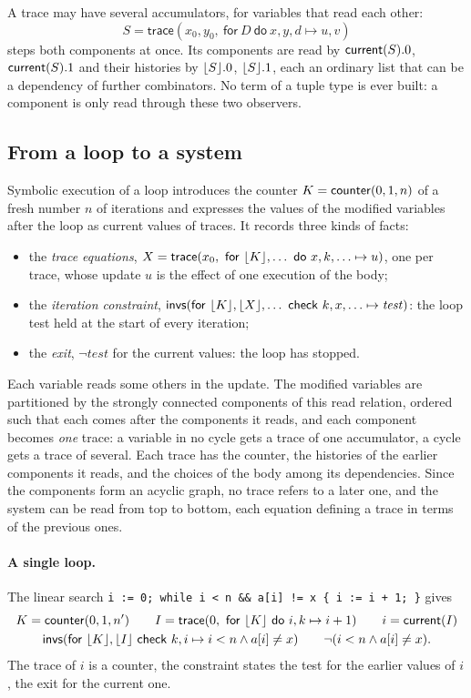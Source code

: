 A trace may have several accumulators, for variables that read each other:
\[ S = \mathsf{trace}(x_0, y_0,\ \mathsf{for}\ D\ \mathsf{do}\ x, y, d \mapsto u, v) \]
steps both components at once. Its components are read by $\mathsf{current}(S).0$, $\mathsf{current}(S).1$ and their histories by
$\lfloor S\rfloor.0$, $\lfloor S\rfloor.1$, each an ordinary list that can be a dependency of further combinators. No term of a
tuple type is ever built: a component is only read through these two observers.

\subsection{From a loop to a system}
Symbolic execution of a loop introduces the counter $K = \mathsf{counter}(0, 1, n)$ of a fresh number $n$ of
iterations and expresses the values of the modified variables after the loop as current values of
traces. It records three kinds of facts:
\begin{itemize}[nosep]
\item the \emph{trace equations}, $X = \mathsf{trace}(x_0,\ \mathsf{for}\ \lfloor K\rfloor, \ldots\ \mathsf{do}\ x, k, \ldots \mapsto u)$, one per
  trace, whose update $u$ is the effect of one execution of the body;
\item the \emph{iteration constraint}, $\mathsf{invs}(\mathsf{for}\ \lfloor K\rfloor, \lfloor X\rfloor, \ldots\ \mathsf{check}\ k, x, \ldots \mapsto \mathit{test})$:
  the loop test held at the start of every iteration;
\item the \emph{exit}, $\neg\mathit{test}$ for the current values: the loop has stopped.
\end{itemize}
Each variable reads some others in the update. The modified variables are partitioned by the strongly
connected components of this read relation, ordered such that each comes after the components it reads, and
each component becomes \emph{one} trace: a variable in no cycle gets a trace of one accumulator, a cycle
gets a trace of several. Each trace has the counter, the histories of the earlier components it reads, and
the choices of the body among its dependencies. Since the components form an acyclic graph, no trace refers
to a later one, and the system can be read from top to bottom, each equation defining a trace in terms of
the previous ones.

\paragraph{A single loop.}
The linear search \texttt{i := 0; while i < n \&\& a[i] != x \{ i := i + 1; \}} gives
\begin{gather*}
  K = \mathsf{counter}(0, 1, n') \qquad I = \mathsf{trace}(0,\ \mathsf{for}\ \lfloor K\rfloor\ \mathsf{do}\ i, k \mapsto i + 1) \qquad i = \mathsf{current}(I)\\
  \mathsf{invs}(\mathsf{for}\ \lfloor K\rfloor, \lfloor I\rfloor\ \mathsf{check}\ k, i \mapsto i < n \wedge a[i] \ne x) \qquad \neg(i < n \wedge a[i] \ne x).
\end{gather*}
The trace of $i$ is a counter, the constraint states the test for the earlier values of $i$, the exit for
the current one.

